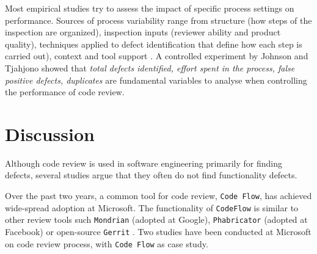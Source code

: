 \documentclass[ifip]{svmult}
\begin{document}
Most empirical studies try to assess the impact of specific process settings on performance.
Sources of process variability range from structure (how steps of the inspection 
are organized), inspection inputs (reviewer ability and product quality), 
techniques applied to defect identification that define how each step is carried out), 
context and tool support \cite{contribution16}.  
A controlled experiment by Johnson and Tjahjono \cite{contribution17} showed that \textit{total defects identified, effort spent in the 
process, false positive defects, duplicates} are fundamental variables to analyse when controlling the performance of code review. 

\section{Discussion}
\label{sec:2}


Although code review is used in software engineering primarily for finding defects, several studies argue that they often 
do not find functionality defects.

Over the past two years, a common tool for code review, \texttt{Code Flow}, has achieved wide-spread adoption at Microsoft. 
The functionality of \texttt{CodeFlow} is similar to other review tools such \texttt{Mondrian} \cite{contribution6} 
(adopted at Google), \texttt{Phabricator} 
\cite{contribution7} (adopted at Facebook) or open-source \texttt{Gerrit} \cite{contribution8}.
Two studies have been conducted at Microsoft on code review process, with \texttt{Code Flow} as case study.
\end{document}
